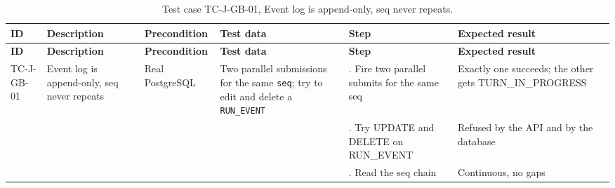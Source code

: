 {\footnotesize{}\renewcommand{\arraystretch}{1.1}
\begin{longtable}{|>{\raggedright\arraybackslash}p{}|>{\raggedright\arraybackslash}p{}|>{\raggedright\arraybackslash}p{}|>{\raggedright\arraybackslash}p{}|>{\raggedright\arraybackslash}p{}|>{\raggedright\arraybackslash}p{}|}
\caption{Test case TC-J-GB-01, Event log is append-\allowbreak{}only, seq never repeats.} \\
\hline
\textbf{ID} & \textbf{Description} & \textbf{Precondition} & \textbf{Test data} & \textbf{Step} & \textbf{Expected result} \\ \hline
\endfirsthead
\hline
\textbf{ID} & \textbf{Description} & \textbf{Precondition} & \textbf{Test data} & \textbf{Step} & \textbf{Expected result} \\ \hline
\endhead
TC-J-GB-01 & Event log is append-\allowbreak{}only, seq never repeats & Real PostgreSQL & Two parallel submissions for the same \texttt{seq}; try to edit and delete a \texttt{RUN\_\allowbreak{}EVENT} & 1. Fire two parallel submits for the same seq & Exactly one succeeds; the other gets TURN\_\allowbreak{}IN\_\allowbreak{}PROGRESS \\ \cline{5-6}
 &  &  &  & 2. Try UPDATE and DELETE on RUN\_EVENT & Refused by the API and by the database \\ \cline{5-6}
 &  &  &  & 3. Read the seq chain & Continuous, no gaps \\ \hline
\end{longtable}
}

